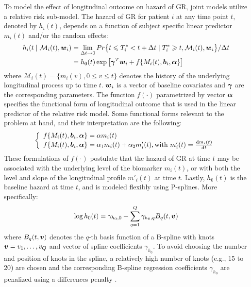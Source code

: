 To model the effect of longitudinal outcome on hazard of GR, joint models utilize a relative risk sub-model. The hazard of GR for patient $i$ at any time point $t$, denoted by $h_i(t)$, depends on a function of subject specific linear predictor $m_i(t)$ and/or the random effects:
\begin{align*}
h_i(t \mid \mathcal{M}_i(t), \boldsymbol{w}_i) &= \lim_{\Delta t \to 0} Pr\big\{t \leqslant T^*_i < t + \Delta t \mid T^*_i \geqslant t, \mathcal{M}_i(t), \boldsymbol{w}_i\big\}/\Delta t\\
&=h_0(t) \exp\big[\boldsymbol{\gamma}^T\boldsymbol{w}_i + f\{M_i(t), \boldsymbol{b}_i, \boldsymbol{\alpha}\}\big]
\end{align*}
where $\mathcal{M}_i(t) = \{m_i(v), 0\leq v \leq t\}$ denotes the history of the underlying longitudinal process up to time $t$. $\boldsymbol{w}_i$ is a vector of baseline covariates and $\boldsymbol{\gamma}$ are the corresponding parameters. The function $f(\cdot)$ parametrized by vector $\boldsymbol{\alpha}$ specifies the functional form \citep{brown2009assessing,rizopoulos2012joint,taylor2013real,rizopoulos2014bma,rizopoulosJMbayes} of longitudinal outcome that is used in the linear predictor of the relative risk model. Some functional forms relevant to the problem at hand, and their interpretation are the following: 
\begin{eqnarray*}
\left \{
\begin{array}{l}
f\{M_i(t), \boldsymbol{b}_i, \boldsymbol{\alpha}\} = \alpha m_i(t)\\
f\{M_i(t), \boldsymbol{b}_i, \boldsymbol{\alpha}\} = \alpha_1 m_i(t) + \alpha_2 m'_i(t), \text{with}\  m'_i(t) = \frac{\mathrm{d}{m_i(t)}}{\mathrm{d}{t}}\\
\end{array}
\right.
\end{eqnarray*}
These formulations of $f(\cdot)$ postulate that the hazard of GR at time $t$ may be associated with the underlying level of the biomarker $m_i(t)$, or with both the level and slope of the longitudinal profile $m'_i(t)$ at time $t$. Lastly, $h_0(t)$ is the baseline hazard at time $t$, and is modeled flexibly using P-splines. More specifically:
\begin{equation*}
\log{h_0(t)} = \gamma_{h_0,0} + \sum_{q=1}^Q \gamma_{h_0,q} B_q(t, \boldsymbol{v})
\end{equation*}
where $B_q(t, \boldsymbol{v})$ denotes the $q$-th basis function of a B-spline with knots $\boldsymbol{v} = v_1, \ldots, v_Q$ and vector of spline coefficients $\gamma_{h_0}$. To avoid choosing the number and position of knots in the spline, a relatively high number of knots (e.g., 15 to 20) are chosen and the corresponding B-spline regression coefficients $\gamma_{h_0}$ are penalized using a differences penalty \citep{eilers1996flexible}.


